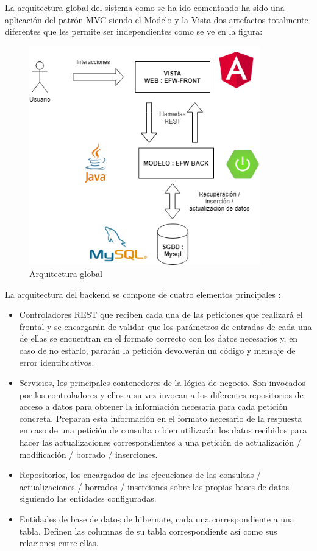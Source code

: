 \documentclass[12pt, a4paper, twoside]{book}
\begin{document}
	La arquitectura global del sistema como se ha ido comentando ha sido una aplicación del patrón MVC siendo el Modelo y la Vista dos artefactos totalmente diferentes que les permite ser independientes como se ve en la figura:
	
	\begin{figure}[H]
		\centering
		\includegraphics[width=10cm]{Imagenes/Arquitectura.png}
		\caption{Arquitectura global}\label{Arquitectura global}
	\end{figure}
	
	La arquitectura del backend se compone de cuatro elementos principales :
	
	\begin{itemize}
		\item Controladores REST que reciben cada una de las peticiones que realizará el frontal y se encargarán de validar que los parámetros de entradas de cada una de ellas se encuentran en el formato correcto con los datos necesarios y, en caso de no estarlo, pararán la petición devolverán un código y mensaje de error identificativos.
		\item Servicios, los principales contenedores de la lógica de negocio. Son invocados por los controladores y ellos a su vez invocan a los diferentes repositorios de acceso a datos para obtener la información necesaria para cada petición concreta. Preparan esta información en el formato necesario de la respuesta en caso de una petición de consulta o bien utilizarán los datos recibidos para hacer las actualizaciones correspondientes a una petición de actualización / modificación / borrado / inserciones.
		\item Repositorios, los encargados de las ejecuciones de las consultas / actualizaciones / borrados / inserciones sobre las propias bases de datos siguiendo las entidades configuradas.
		\item Entidades de base de datos de hibernate, cada una correspondiente a una tabla. Definen las columnas de su tabla correspondiente así como sus relaciones entre ellas.
	\end{itemize} 
\end{document}
